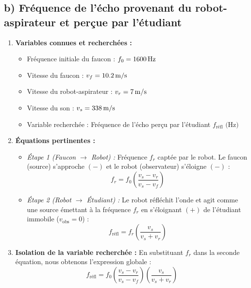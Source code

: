 \subsection*{b) Fréquence de l'écho provenant du robot-aspirateur et perçue par l'étudiant}

\begin{enumerate}[label=\arabic*)]
    \item \textbf{Variables connues et recherchées :}
    \begin{itemize}[label=$\bullet$]
        \item Fréquence initiale du faucon : $f_0 = \qty{1600}{Hz}$
        \item Vitesse du faucon : $v_f = \qty{10.2}{m/s}$
        \item Vitesse du robot-aspirateur : $v_r = \qty{7}{m/s}$
        \item Vitesse du son : $v_s = \qty{338}{m/s}$
        \item Variable recherchée : Fréquence de l'écho perçu par l'étudiant $f_{\text{réfl}} \text{ (Hz)}$
    \end{itemize}

    \item \textbf{Équations pertinentes :}
    \begin{itemize}[label=-]
        \item \textit{Étape 1 (Faucon $\rightarrow$ Robot) :} Fréquence $f_r$ captée par le robot. Le faucon (source) s'approche $(-)$ et le robot (observateur) s'éloigne $(-)$ :
        \[
        f_r = f_0 \left( \frac{v_s - v_r}{v_s - v_f} \right)
        \]
        \item \textit{Étape 2 (Robot $\rightarrow$ Étudiant) :} Le robot réfléchit l'onde et agit comme une source émettant à la fréquence $f_r$ en s'éloignant $(+)$ de l'étudiant immobile ($v_{\text{obs}} = 0$) :
        \[
        f_{\text{réfl}} = f_r \left( \frac{v_s}{v_s + v_r} \right)
        \]
    \end{itemize}

    \item \textbf{Isolation de la variable recherchée :}
    En substituant $f_r$ dans la seconde équation, nous obtenons l'expression globale :
    \[
    f_{\text{réfl}} = f_0 \left( \frac{v_s - v_r}{v_s - v_f} \right) \left( \frac{v_s}{v_s + v_r} \right)
    \]


\end{enumerate}
